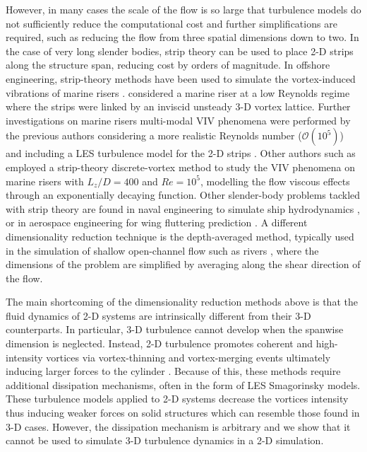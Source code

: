\documentclass[../main.tex]{subfiles}
\begin{document}
However, in many cases the scale of the flow is so large that turbulence models do not sufficiently reduce the computational cost and further simplifications are required, such as reducing the flow from three spatial dimensions down to two.
In the case of very long slender bodies, strip theory can be used to place 2-D strips along the structure span, reducing cost by orders of magnitude.
In offshore engineering, strip-theory methods have been used to simulate the vortex-induced vibrations of marine risers \citep{Herfjord1999}. \cite{Willden2001} considered a marine riser at a low Reynolds regime where the strips were linked by an inviscid unsteady 3-D vortex lattice.
Further investigations on marine risers multi-modal VIV phenomena were performed by the previous authors considering a more realistic Reynolds number ($\mathcal{O}(10^5)$) and including a LES turbulence model for the 2-D strips \citep{Willden2004}.
Other authors such as \cite{Yamamoto2004, Meneghini2004, Sun2012} employed a strip-theory discrete-vortex method to study the VIV phenomena on marine risers with $L_z/D=400$ and $Re=10^5$, modelling the flow viscous effects through an exponentially decaying function.
Other slender-body problems tackled with strip theory are found in naval engineering to simulate ship hydrodynamics \citep{Newman1979}, or in aerospace engineering for wing fluttering prediction \citep{Yates1966}.
A different dimensionality reduction technique is the depth-averaged method, typically used in the simulation of shallow open-channel flow such as rivers \citep{Molls1995}, where the dimensions of the problem are simplified by averaging along the shear direction of the flow.

The main shortcoming of the dimensionality reduction methods above is that the fluid dynamics of 2-D systems are intrinsically different from their 3-D counterparts.
In particular, 3-D turbulence cannot develop when the spanwise dimension is neglected.
Instead, 2-D turbulence promotes coherent and high-intensity vortices via vortex-thinning and vortex-merging events \citep{Xiao2009} ultimately inducing larger forces to the cylinder \citep{Mittal1995, Norberg2003}.
Because of this, these methods require additional dissipation mechanisms, often in the form of LES Smagorinsky models.
These turbulence models applied to 2-D systems decrease the vortices intensity thus inducing weaker forces on solid structures which can resemble those found in 3-D cases.
However, the dissipation mechanism is arbitrary and we show that it cannot be used to simulate 3-D turbulence dynamics in a 2-D simulation.
\end{document}
